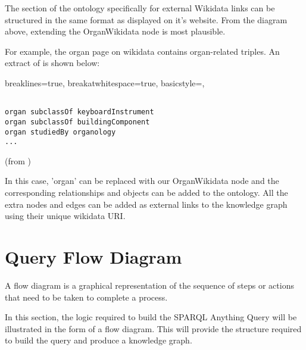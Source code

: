 The section of the ontology specifically for external Wikidata links can be structured in the same format as displayed on it's website. From the diagram above, extending the OrganWikidata node is most plausible.

For example, the organ page on wikidata \cite{organwikidata} contains organ-related triples. An extract of \cite{organwikidata} is shown below:

\lstset
{
    breaklines=true,
    breakatwhitespace=true,
    basicstyle=\ttfamily,
}
\begin{lstlisting}

organ subclassOf keyboardInstrument
organ subclassOf buildingComponent
organ studiedBy organology 
...

\end{lstlisting}
(from \cite{organwikidata})

In this case, 'organ' can be replaced with our OrganWikidata node and the corresponding relationships and objects can be added to the ontology. All the extra nodes and edges can be added as external links to the knowledge graph using their unique wikidata URI. 

\section{Query Flow Diagram}
\hspace{0.5cm} A flow diagram is a graphical representation of the sequence of steps or actions that need to be taken to complete a process. \cite{flowchart}

In this section, the logic required to build the SPARQL Anything Query will be illustrated in the form of a flow diagram. This will provide the structure required to build the query and produce a knowledge graph.

